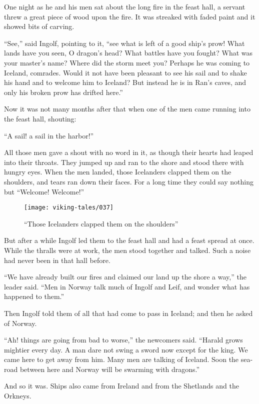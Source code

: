 One night as he and his men sat about the long fire in the feast hall, a
servant threw a great piece of wood upon the fire. It was streaked with
faded paint and it showed bits of carving.

``See,'' said Ingolf, pointing to it, ``see what is left of a good
ship's prow! What lands have you seen, O dragon's head? What battles
have you fought? What was your master's name? Where did the storm meet
you? Perhaps he was coming to Iceland, comrades. Would it not have been
pleasant to see his sail and to shake his hand and to welcome him to
Iceland? But instead he is in Ran's caves, and only his broken prow has
drifted here.''

Now it was not many months after that when one of the men came running
into the feast hall, shouting:

``A sail! a sail in the harbor!''

All those men gave a shout with no word in it, as though their hearts
had leaped into their throats. They jumped up and ran to the shore and
stood there with hungry eyes. When the men landed, those Icelanders
clapped them on the shoulders, and tears ran down their faces. For a
long time they could say nothing but ``Welcome! Welcome!''

\begin{figure}[ht]
    \centering
    \texttt{[image: viking-tales/037]}
    \caption{``Those Icelanders clapped them on the shoulders''}
\end{figure}

But after a while Ingolf led them to the feast hall and had a feast
spread at once. While the thralls were at work, the men stood together
and talked. Such a noise had never been in that hall before.

``We have already built our fires and claimed our land up the shore a
way,'' the leader said. ``Men in Norway talk much of Ingolf and Leif,
and wonder what has happened to them.''

Then Ingolf told them of all that had come to pass in Iceland; and then
he asked of Norway.

``Ah! things are going from bad to worse,'' the newcomers said. ``Harald
grows mightier every day. A man dare not swing a sword now except for
the king. We came here to get away from him. Many men are talking of
Iceland. Soon the sea-road between here and Norway will be swarming with
dragons.''

And so it was. Ships also came from Ireland and from the Shetlands and
the Orkneys.

